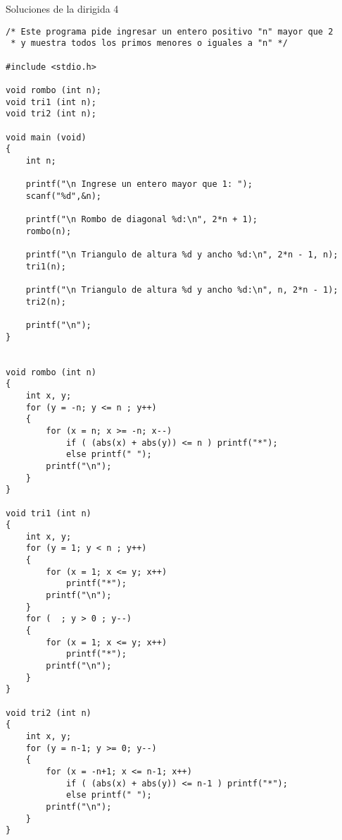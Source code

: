 \documentclass[twoside,10.5pt]{article}%
\begin{document}
\begin{center}
{\LARGE{Soluciones de la dirigida 4}}\\[20pt]
\end{center}

\vspace{0.3cm}




\begin{verbatim}
/* Este programa pide ingresar un entero positivo "n" mayor que 2 
 * y muestra todos los primos menores o iguales a "n" */
 
#include <stdio.h>

void rombo (int n);
void tri1 (int n);
void tri2 (int n);

void main (void)
{
	int n;
	
	printf("\n Ingrese un entero mayor que 1: ");
    scanf("%d",&n);
    
    printf("\n Rombo de diagonal %d:\n", 2*n + 1);
	rombo(n);
	
	printf("\n Triangulo de altura %d y ancho %d:\n", 2*n - 1, n);
	tri1(n);
	
	printf("\n Triangulo de altura %d y ancho %d:\n", n, 2*n - 1);
	tri2(n);

	printf("\n");
}


void rombo (int n)
{
	int x, y;
    for (y = -n; y <= n ; y++)
    {
        for (x = n; x >= -n; x--)
            if ( (abs(x) + abs(y)) <= n ) printf("*"); 
            else printf(" ");
        printf("\n");
    }
}

void tri1 (int n)
{
	int x, y;
    for (y = 1; y < n ; y++)
    {
        for (x = 1; x <= y; x++)
            printf("*");
        printf("\n");
    }
    for (  ; y > 0 ; y--)
    {
        for (x = 1; x <= y; x++)
            printf("*");
        printf("\n");
    }
}

void tri2 (int n)
{
	int x, y;
    for (y = n-1; y >= 0; y--)
    {
        for (x = -n+1; x <= n-1; x++)
            if ( (abs(x) + abs(y)) <= n-1 ) printf("*"); 
            else printf(" ");
        printf("\n");
    }
}
\end{verbatim}

\vspace{0.3cm}
\end{document}
